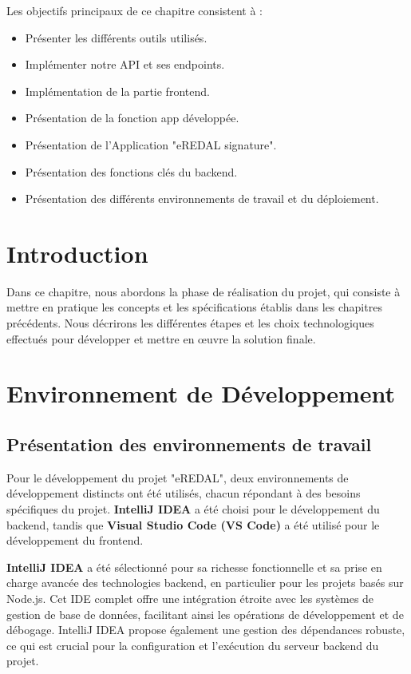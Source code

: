 Les objectifs principaux de ce chapitre consistent à :\begin{itemize}
    \item Présenter les différents outils utilisés.
    \item Implémenter notre API et ses endpoints.
    \item Implémentation de la partie frontend.
    \item Présentation de la fonction app développée.
    \item Présentation de l'Application "eREDAL signature".
    \item Présentation des fonctions clés du backend.
    \item Présentation des différents environnements de travail et du déploiement.
\end{itemize}





\newpage
\section{Introduction}
Dans ce chapitre, nous abordons la phase de réalisation du projet, qui consiste à mettre en pratique les concepts et les spécifications établis dans les chapitres précédents. Nous décrirons les différentes étapes et les choix technologiques effectués pour développer et mettre en œuvre la solution finale.


\section{ Environnement de Développement}
\subsection{Présentation des environnements de travail }

Pour le développement du projet "eREDAL", deux environnements de développement distincts ont été utilisés, chacun répondant à des besoins spécifiques du projet. \textbf{IntelliJ IDEA} a été choisi pour le développement du backend, tandis que \textbf{Visual Studio Code (VS Code)} a été utilisé pour le développement du frontend.

\textbf{IntelliJ IDEA} a été sélectionné pour sa richesse fonctionnelle et sa prise en charge avancée des technologies backend, en particulier pour les projets basés sur Node.js. Cet IDE complet offre une intégration étroite avec les systèmes de gestion de base de données, facilitant ainsi les opérations de développement et de débogage. IntelliJ IDEA propose également une gestion des dépendances robuste, ce qui est crucial pour la configuration et l'exécution du serveur backend du projet.

